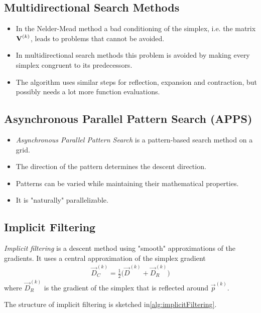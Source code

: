 		\subsection{Multidirectional Search Methods}
			\begin{itemize}
				\item In the Nelder-Mead method a bad conditioning of the simplex, i.e. the matrix \( \bm{\mathrm{V}}^{(k)} \), leads to problems that cannot be avoided.
				\item In multidirectional search methods this problem is avoided by making every simplex congruent to its predecessors.
				\item The algorithm uses similar steps for reflection, expansion and contraction, but possibly needs a lot more function evaluations.
			\end{itemize}

		\subsection{Asynchronous Parallel Pattern Search (APPS)}
			\begin{itemize}
				\item \emph{Asynchronous Parallel Pattern Search} is a pattern-based search method on a grid.
				\item The direction of the pattern determines the descent direction.
				\item Patterns can be varied while maintaining their mathematical properties.
				\item It is "naturally" parallelizable.
			\end{itemize}

		\subsection{Implicit Filtering}
			\emph{Implicit filtering} is a descent method using "smooth" approximations of the gradients. It uses a central approximation of the simplex gradient
			\begin{align*}
				\vec{D}_C^{(k)} = \frac{1}{2} \big( \vec{D}^{(k)} + \vec{D}_R^{(k)} \big)
			\end{align*}
			where \( \vec{D}_R^{(k)} \) is the gradient of the simplex that is reflected around \( \vec{p}^{(k)} \).

			The structure of implicit filtering is sketched in\autoref{alg:implicitFiltering}.

